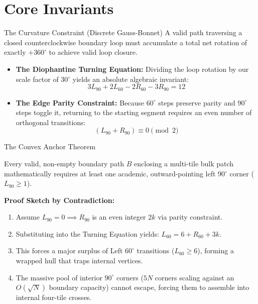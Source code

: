 \documentclass[10pt]{beamer}
\begin{document}
\section{Core Invariants}

\begin{frame}{The Curvature Constraint (Discrete Gauss-Bonnet)}
A valid path traversing a closed counterclockwise boundary loop must accumulate a total net rotation of exactly $+360^\circ$ to achieve valid loop closure.
\vfill
\begin{itemize}
    \item \textbf{The Diophantine Turning Equation:} Dividing the loop rotation by our scale factor of 30$^\circ$ yields an absolute algebraic invariant:
    \begin{equation}
    3L_{90} + 2L_{60} - 2R_{60} - 3R_{90} = 12
    \end{equation}
    \item \textbf{The Edge Parity Constraint:} Because $60^\circ$ steps preserve parity and $90^\circ$ steps toggle it, returning to the starting segment requires an even number of orthogonal transitions:
    \begin{equation}
    (L_{90} + R_{90}) \equiv 0 \pmod 2
    \end{equation}
\end{itemize}
\end{frame}

\begin{frame}{The Convex Anchor Theorem}
\begin{theorem}
Every valid, non-empty boundary path $B$ enclosing a multi-tile bulk patch mathematically requires at least one academic, outward-pointing left 90$^\circ$ corner ($L_{90} \ge 1$).
\end{theorem}
\vfill
\textbf{Proof Sketch by Contradiction:}
\begin{enumerate}
    \item Assume $L_{90} = 0 \implies R_{90}$ is an even integer $2k$ via parity constraint.
    \item Substituting into the Turning Equation yields: $L_{60} = 6 + R_{60} + 3k$.
    \item This forces a major surplus of Left $60^\circ$ transitions ($L_{60} \ge 6$), forming a wrapped hull that traps internal vertices.
    \item The massive pool of interior $90^\circ$ corners ($5N$ corners scaling against an $O(\sqrt{N})$ boundary capacity) cannot escape, forcing them to assemble into internal four-tile crosses.
\end{enumerate}
\end{frame}
\end{document}

